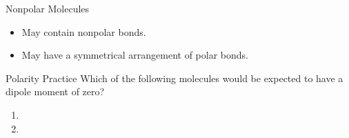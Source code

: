 \documentclass[notes=show]{beamer}
\begin{document}
\begin{frame}{Nonpolar Molecules}
	\begin{itemize}
		\item \alert{May} contain \alert{nonpolar} bonds.

			\begin{center}
				\hspace{5em}
			\end{center}

		\item \alert{May} have a symmetrical arrangement of polar bonds.

			\bigskip

			\begin{center}
				\hspace{5em}
			\end{center}
	\end{itemize}
\end{frame}

\begin{frame}[t]{Polarity Practice}
	Which of the following molecules would be expected to have a dipole
	moment of zero?

	\begin{enumerate}
		\item {}
		\item {}
	\end{enumerate}
	
	\vspace{8em}
\end{frame}

%
\end{document}
